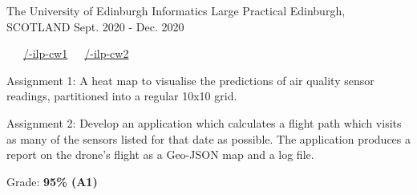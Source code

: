 \begin{cventries}
  \cventry
    {The University of Edinburgh} %
    {Informatics Large Practical} %
    {Edinburgh, SCOTLAND} %
    {Sept. 2020 - Dec. 2020} %
    {
      \color{awesome} \color{graytext}\ \ \ \href{https://github.com/chrisjpm/inf3-ilp-cw1}{\faGithub\acvHeaderIconSep\@chrisjpm/-ilp-cw1}\ \ \ \href{https://github.com/chrisjpm/inf3-ilp-cw2}{\faGithub\acvHeaderIconSep\@chrisjpm/-ilp-cw2}
      \vspace{1.6em}
      \begin{cvitems} %
        \item Assignment 1: A heat map to visualise the predictions of air quality sensor readings, partitioned into a regular 10x10 grid.
        \item Assignment 2: Develop an application which calculates a flight path which visits as many of the sensors listed for that date as possible. The application produces a report on the drone’s flight as a Geo-JSON map and a log file.
        \item Grade: \textbf{95\% (A1)}
      \end{cvitems}
    }
\end{cventries}
\vspace{-.5em}
